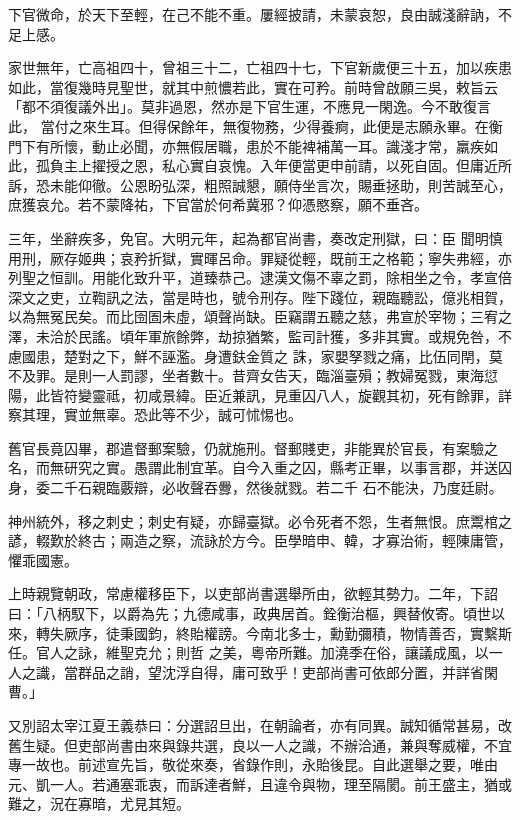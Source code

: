 \begin{pinyinscope}
 下官微命，於天下至輕，在己不能不重。屢經披請，未蒙哀恕，良由誠淺辭訥，不足上感。



 家世無年，亡高祖四十，曾祖三十二，亡祖四十七，下官新歲便三十五，加以疾患如此，當復幾時見聖世，就其中煎憹若此，實在可矜。前時曾啟願三吳，敕旨云「都不須復議外出」。莫非過恩，然亦是下官生運，不應見一閑逸。今不敢復言此，
 當付之來生耳。但得保餘年，無復物務，少得養痾，此便是志願永畢。在衡門下有所懷，動止必聞，亦無假居職，患於不能裨補萬一耳。識淺才常，羸疾如此，孤負主上擢授之恩，私心實自哀愧。入年便當更申前請，以死自固。但庸近所訴，恐未能仰徹。公恩盼弘深，粗照誠懇，願侍坐言次，賜垂拯助，則苦誠至心，庶獲哀允。若不蒙降祐，下官當於何希冀邪？仰憑愍察，願不垂吝。



 三年，坐辭疾多，免官。大明元年，起為都官尚書，奏改定刑獄，曰：臣
 聞明慎用刑，厥存姬典；哀矜折獄，實暉呂命。罪疑從輕，既前王之格範；寧失弗經，亦列聖之恒訓。用能化致升平，道臻恭己。逮漢文傷不辜之罰，除相坐之令，孝宣倍深文之吏，立鞫訊之法，當是時也，號令刑存。陛下踐位，親臨聽訟，億兆相賀，以為無冤民矣。而比囹圄未虛，頌聲尚缺。臣竊謂五聽之慈，弗宣於宰物；三宥之澤，未洽於民謠。頃年軍旅餘弊，劫掠猶繁，監司計獲，多非其實。或規免咎，不慮國患，楚對之下，鮮不誣濫。身遭鈇金質之
 誅，家嬰孥戮之痛，比伍同閈，莫不及罪。是則一人罰謬，坐者數十。昔齊女告天，臨淄臺殞；教婦冤戮，東海愆陽，此皆符變靈祗，初咸景緯。臣近兼訊，見重囚八人，旋觀其初，死有餘罪，詳察其理，實並無辜。恐此等不少，誠可怵惕也。



 舊官長竟囚畢，郡遣督郵案驗，仍就施刑。督郵賤吏，非能異於官長，有案驗之名，而無研究之實。愚謂此制宜革。自今入重之囚，縣考正畢，以事言郡，并送囚身，委二千石親臨覈辯，必收聲吞釁，然後就戮。若二千
 石不能決，乃度廷尉。



 神州統外，移之刺史；刺史有疑，亦歸臺獄。必令死者不怨，生者無恨。庶鬻棺之諺，輟歎於終古；兩造之察，流詠於方今。臣學暗申、韓，才寡治術，輕陳庸管，懼乖國憲。



 上時親覽朝政，常慮權移臣下，以吏部尚書選舉所由，欲輕其勢力。二年，下詔曰：「八柄馭下，以爵為先；九德咸事，政典居首。銓衡治樞，興替攸寄。頃世以來，轉失厥序，徒秉國鈞，終貽權謗。今南北多士，勳勤彌積，物情善否，實繫斯任。官人之詠，維聖克允；則哲
 之美，粵帝所難。加澆季在俗，讓議成風，以一人之識，當群品之誚，望沈浮自得，庸可致乎！吏部尚書可依郎分置，并詳省閑曹。」



 又別詔太宰江夏王義恭曰：分選詔旦出，在朝論者，亦有同異。誠知循常甚易，改舊生疑。但吏部尚書由來與錄共選，良以一人之識，不辦洽通，兼與奪威權，不宜專一故也。前述宣先旨，敬從來奏，省錄作則，永貽後昆。自此選舉之要，唯由元、凱一人。若通塞乖衷，而訴達者鮮，且違令與物，理至隔閡。前王盛主，猶或
 難之，況在寡暗，尤見其短。




\end{pinyinscope}
